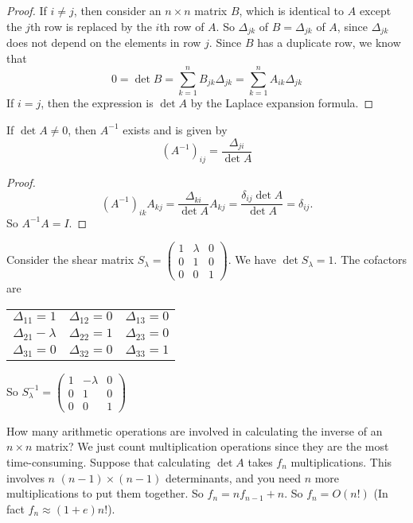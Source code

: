 \documentclass[a4paper]{article}
\begin{document}
\begin{proof}
  If $i \not= j$, then consider an $n\times n$ matrix $B$, which is identical to $A$ except the $j$th row is replaced by the $i$th row of $A$. So $\Delta_{jk}$ of $B = \Delta_{jk}$ of $A$, since $\Delta_{jk}$ does not depend on the elements in row $j$. Since $B$ has a duplicate row, we know that
  \[
    0 = \det B = \sum_{k = 1}^n B_{jk}\Delta_{jk} = \sum_{k = 1}^n A_{ik}\Delta_{jk}
  \]
  If $i = j$, then the expression is $\det A$ by the Laplace expansion formula.
\end{proof}

\begin{thm}
  If $\det A \not =0$, then $A^{-1}$ exists and is given by
  \[
    (A^{-1})_{ij} = \frac{\Delta_{ji}}{\det A}
  \]
\end{thm}

\begin{proof}
  \[
    (A^{-1})_{ik}A_{kj} = \frac{\Delta_{ki}}{\det A} A_{kj} = \frac{\delta_{ij}\det A}{\det A} = \delta_{ij}.
  \]
  So $A^{-1}A = I$.
\end{proof}

\begin{eg}
  Consider the shear matrix $S_\lambda = \begin{pmatrix} 1 & \lambda & 0 \\ 0 & 1 & 0\\ 0 & 0 & 1\end{pmatrix}$. We have $\det{S_\lambda} = 1$. The cofactors are\\
  \begin{tabular}{ccc}
    $\Delta_{11} = 1$       & $\Delta_{12} = 0$ & $\Delta_{13} = 0$ \\
    $\Delta_{21} - \lambda$ & $\Delta_{22} = 1$ & $\Delta_{23} = 0$ \\
    $\Delta_{31} = 0$       & $\Delta_{32} = 0$ & $\Delta_{33} = 1$
  \end{tabular}

  So $S_\lambda^{-1} = \begin{pmatrix} 1 & -\lambda & 0\\ 0 & 1 & 0\\ 0 & 0 & 1\end{pmatrix}$
\end{eg}

How many arithmetic operations are involved in calculating the inverse of an $n\times n$ matrix? We just count multiplication operations since they are the most time-consuming. Suppose that calculating $\det A$ takes $f_n$ multiplications. This involves $n$ $(n - 1)\times (n - 1)$ determinants, and you need $n$ more multiplications to put them together. So $f_n = nf_{n -1} + n$. So $f_n = O(n!)$ (In fact $f_n \approx (1 + e)n!$).
\end{document}
